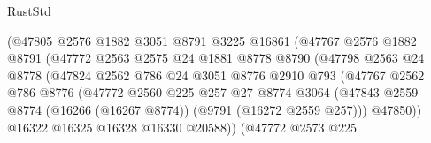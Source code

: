 \begin{lexlean}{RustStd}
\begin{coremodule}
                                (@47805
                                  @2576
                                  @1882
                                  @3051
                                  @8791
                                  @3225
                                  @16861
                                  (@47767
                                    @2576
                                    @1882
                                    @8791
                                    (@47772
                                      @2563
                                      @2575
                                      @24
                                      @1881
                                      @8778
                                      @8790
                                      (@47798
                                        @2563
                                        @24
                                        @8778
                                        (@47824
                                          @2562
                                          @786
                                          @24
                                          @3051
                                          @8776
                                          @2910
                                          @793
                                          (@47767
                                            @2562
                                            @786
                                            @8776
                                            (@47772
                                              @2560
                                              @225
                                              @257
                                              @27
                                              @8774
                                              @3064
                                              (@47843
                                                @2559
                                                @8774
                                                (@16266 (@16267 @8774))
                                                (@9791 (@16272 @2559 @257)))
                                              @47850))
                                          @16322
                                          @16325
                                          @16328
                                          @16330
                                          @20588))
                                      (@47772
                                        @2573
                                        @225

\end{coremodule}
\end{lexlean}
